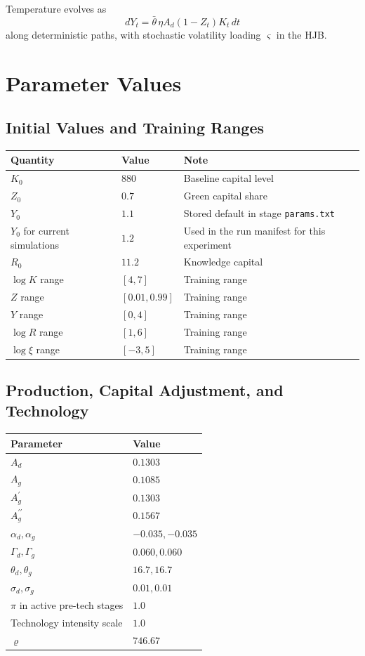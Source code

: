 \documentclass[11pt]{article}
\begin{document}
Temperature evolves as
\[
dY_t=\bar\theta\,\eta A_d(1-Z_t)K_t\,dt
\]
along deterministic paths, with stochastic volatility loading $\varsigma$ in the HJB.

\section{Parameter Values}

\subsection*{Initial Values and Training Ranges}

\begin{center}
\begin{tabular}{lll}
\toprule
Quantity & Value & Note \\
\midrule
$K_0$ & $880$ & Baseline capital level \\
$Z_0$ & $0.7$ & Green capital share \\
$Y_0$ & $1.1$ & Stored default in stage \texttt{params.txt} \\
$Y_0$ for current simulations & $1.2$ & Used in the run manifest for this experiment \\
$R_0$ & $11.2$ & Knowledge capital \\
$\log K$ range & $[4,7]$ & Training range \\
$Z$ range & $[0.01,0.99]$ & Training range \\
$Y$ range & $[0,4]$ & Training range \\
$\log R$ range & $[1,6]$ & Training range \\
$\log \xi$ range & $[-3,5]$ & Training range \\
\bottomrule
\end{tabular}
\end{center}

\subsection*{Production, Capital Adjustment, and Technology}

\begin{center}
\begin{tabular}{ll}
\toprule
Parameter & Value \\
\midrule
$A_d$ & $0.1303$ \\
$A_g$ & $0.1085$ \\
$A_g^{\prime}$ & $0.1303$ \\
$A_g^{\prime\prime}$ & $0.1567$ \\
$\alpha_d,\alpha_g$ & $-0.035,-0.035$ \\
$\Gamma_d,\Gamma_g$ & $0.060,0.060$ \\
$\theta_d,\theta_g$ & $16.7,16.7$ \\
$\sigma_d,\sigma_g$ & $0.01,0.01$ \\
$\pi$ in active pre-tech stages & $1.0$ \\
Technology intensity scale & $1.0$ \\
$\varrho$ & $746.67$ \\
\bottomrule
\end{tabular}
\end{center}
\end{document}
